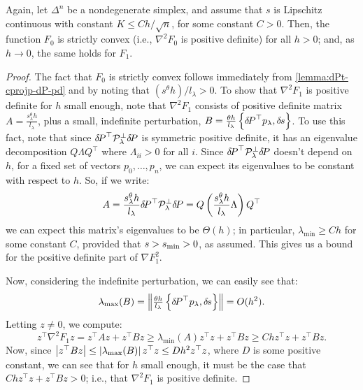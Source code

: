 \documentclass[eikonal.tex]{subfiles}
\begin{document}
\begin{lemma}
  Again, let $\Delta^n$ be a nondegenerate simplex, and assume that
  $s$ is Lipschitz continuous with constant $K \leq Ch/\sqrt{n}$, for
  some constant $C > 0$. Then, the function $F_0$ is strictly convex
  (i.e., $\nabla^2 F_0$ is positive definite) for all $h > 0$; and, as
  $h \to 0$, the same holds for $F_1$.
\end{lemma}

\begin{proof}
  The fact that $F_0$ is strictly convex follows immediately from
  \cref{lemma:dPt-cprojp-dP-pd} and by noting that
  ${(s^\theta h)}/l_\lambda > 0$. To show that $\nabla^2 F_1$ is
  positive definite for $h$ small enough, note that $\nabla^2 F_1$
  consists of positive definite matrix
  $A = \frac{s^\theta_\lambda h}{l_\lambda}$, plus a small, indefinite
  perturbation,
  $B = \tfrac{\theta h}{l_\lambda} \left\{{\delta \hspace{-0.14em} P}^\top p_\lambda,
    {\delta \hspace{-0.1em} s}\right\}$. To use this fact, note that since
  ${\delta \hspace{-0.14em} P}^\top \mathcal{P}^\perp_\lambda {\delta \hspace{-0.14em} P}$ is symmetric
  positive definite, it has an eigenvalue decomposition
  $Q \Lambda Q^\top$ where $\Lambda_{ii} > 0$ for all $i$. Since
  ${\delta \hspace{-0.14em} P}^\top \mathcal{P}^\perp_\lambda {\delta \hspace{-0.14em} P}$ doesn't depend on
  $h$, for a fixed set of vectors $p_0, \hdots, p_n$, we can expect
  its eigenvalues to be constant with respect to $h$. So, if we write:
  \begin{equation}
    A = \frac{s^\theta_\lambda h}{l_\lambda} {\delta \hspace{-0.14em} P}^\top \mathcal{P}^\perp_\lambda {\delta \hspace{-0.14em} P} = Q \left(\frac{s^\theta_\lambda h}{l_\lambda} \Lambda\right) Q^\top
  \end{equation}
  we can expect this matrix's eigenvalues to be $\Theta(h)$; in
  particular, $\lambda_{\min} \geq C h$ for some constant $C$,
  provided that $s > s_{\operatorname{min}} > 0$, as assumed. This gives us a bound for
  the positive definite part of $\nabla F_1^2$.

  Now, considering the indefinite perturbation, we can easily see
  that:
  \begin{equation}
    \lambda_{\max}(B) = \left\|\tfrac{\theta h}{l_\lambda} \left\{{\delta \hspace{-0.14em} P}^\top p_\lambda,
        {\delta \hspace{-0.1em} s}\right\}\right\| = O(h^2).
  \end{equation}
  Letting $z \neq 0$, we compute:
  \begin{equation}
    z^\top \nabla^2 F_1 z = z^\top A z + z^\top B z \geq \lambda_{\min}(A) z^\top z + z^\top B z \geq Ch z^\top z + z^\top B z.
  \end{equation}
  Now, since
  $\left|z^\top B z\right| \leq \left|\lambda_{\max}(B)\right| z^\top z \leq D h^2
  z^\top z$, where $D$ is some positive constant, we can see that for
  $h$ small enough, it must be the case that
  $Ch z^\top z + z^\top B z > 0$; i.e., that $\nabla^2 F_1$ is
  positive definite.
\end{proof}
\end{document}
